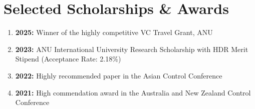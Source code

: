 \section{Selected Scholarships \& Awards}
\begin{enumerate}\itemsep0em
    \item \textbf{2025:} Winner of the highly competitive VC Travel Grant, ANU
    \item \textbf{2023:} ANU International University Research Scholarship with HDR Merit Stipend (Acceptance Rate: 2.18\%)
    \item \textbf{2022:} Highly recommended paper in the Asian Control Conference
    \item \textbf{2021:} High commendation award in the Australia and New Zealand Control Conference
\end{enumerate}
